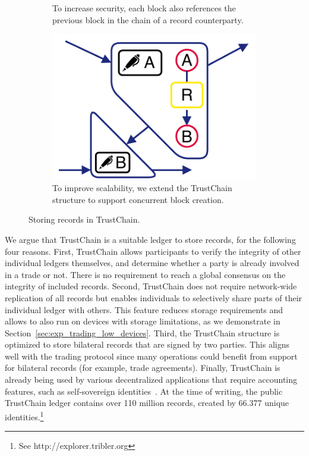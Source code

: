 \begin{figure}[t]
\begin{subfigure}[t]{.33\textwidth}
		\caption{To increase security, each block also references the previous block in the chain of a record counterparty.}
		\label{fig:trustchain_tutorial_3}
	\end{subfigure}
	\begin{subfigure}[t]{.33\textwidth}
		\centering
		\captionsetup{width=.9\linewidth}
		\includegraphics[width=.71\linewidth]{xchange/assets/trustchain_tutorial_4}
		\caption{To improve scalability, we extend the TrustChain structure to support concurrent block creation.}
		\label{fig:trustchain_tutorial_4}
	\end{subfigure}\hspace{0.05\textwidth}%
	\caption{Storing records in TrustChain.}
	\label{fig:trustchain_tutorial}
\end{figure}

We argue that TrustChain is a suitable ledger to store \ModelName{} records, for the following four reasons.
First, TrustChain allows participants to verify the integrity of other individual ledgers themselves, and determine whether a party is already involved in a trade or not.
There is no requirement to reach a global consensus on the integrity of included records.
Second, TrustChain does not require network-wide replication of all records but enables individuals to selectively share parts of their individual ledger with others.
This feature reduces storage requirements and allows \ModelName{} to also run on devices with storage limitations, as we demonstrate in Section~\ref{sec:exp_trading_low_devices}.
Third, the TrustChain structure is optimized to store bilateral records that are signed by two parties.
This aligns well with the \ModelName{} trading protocol since many operations could benefit from support for bilateral records (for example, trade agreements).
Finally, TrustChain is already being used by various decentralized applications that require accounting features, such as self-sovereign identities~\cite{pouwelse2017laws}.
At the time of writing, the public TrustChain ledger contains over 110 million records, created by 66.377 unique identities.\footnote{See http://explorer.tribler.org}

